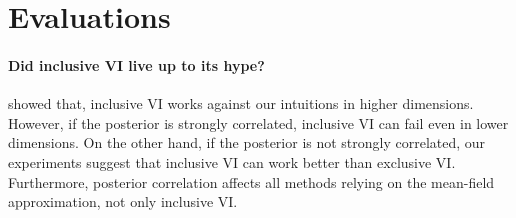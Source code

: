 
\section{Evaluations}\label{section:eval}
\paragraph{Did inclusive VI live up to its hype?}
\citet{dhaka_challenges_2021} showed that, inclusive VI works against our intuitions in higher dimensions.
However, if the posterior is strongly correlated, inclusive VI can fail even in lower dimensions.
On the other hand, if the posterior is not strongly correlated, our experiments suggest that inclusive VI can work better than exclusive VI.
Furthermore, posterior correlation affects all methods relying on the mean-field approximation, not only inclusive VI.

